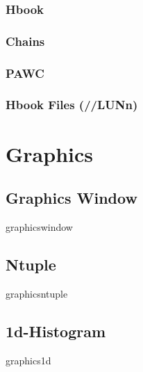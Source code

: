 \subsubsection{Hbook}


\subsubsection{Chains}

\subsubsection{PAWC}


\subsubsection{Hbook Files (//LUNn)}


\newpage

\section{Graphics}

\newpage

\newpage

\subsection{Graphics Window}

\begin{PAWf}[.4]{graphicswindow}
\end{PAWf}


\subsection{Ntuple}

\begin{PAWf}{graphicsntuple}
\end{PAWf}

\newpage

\subsection{1d-Histogram}

\begin{PAWf}{graphics1d}
\end{PAWf}

